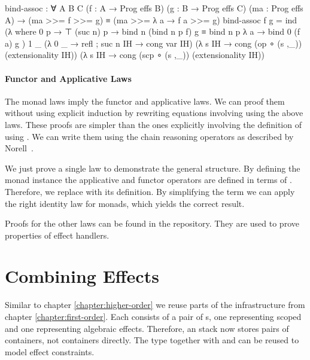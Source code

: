 \begin{code}
bind-assoc : ∀ {A B C}
  (f : A → Prog effs B) (g : B → Prog effs C) (ma : Prog effs A) →
  (ma >>= f >>= g) ≡ (ma >>= λ a → f a >>= g)
bind-assoc f g = ind
  (λ where
    0 p        → ⊤
    (suc n) p  → bind n (bind n p f) g ≡ bind n p λ a → bind 0 (f a) g
  ) 1 _
  (λ{ {0} _ → refl ; {suc n} IH → cong var IH})
  (λ s IH → cong (op   ∘ (s ,_)) (extensionality IH))
  (λ s IH → cong (scp  ∘ (s ,_)) (extensionality IH))
\end{code}

\paragraph{Functor and Applicative Laws}
The monad laws imply the functor and applicative laws.
We can proof them without using explicit induction by rewriting equations
involving \AgdaFunction{>>=} using the above laws.
These proofs are simpler than the ones explicitly involving the definition of
\AgdaFunction{>>=} using .
We can write them using the chain reasoning operators as described by
Norell~\cite{norell:thesis}.

We just prove a single law to demonstrate the general structure.
By defining the monad instance the applicative and functor operators are 
defined in terms of \AgdaFunction{>>=}.
Therefore, we replace \AgdaFunction{<\$>} with its definition.
By simplifying the term we can apply the right identity law for monads, which
yields the correct result.

Proofs for the other laws can be found in the repository.
They are used to prove properties of effect handlers.


\section{Combining Effects}

Similar to chapter \ref{chapter:higher-order} we reuse parts of the
infrastructure from chapter \ref{chapter:first-order}.
Each  consists of a pair of s, one
representing scoped and one representing algebraic effects.
Therefore, an  stack now stores pairs of containers, not
containers directly.
The type  together with  and
 can be reused to model effect constraints.


